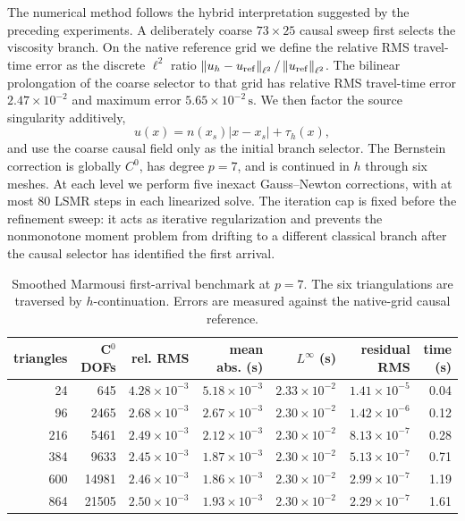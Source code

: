 \documentclass[preprint,12pt]{elsarticle}
\newcommand{\norm}[1]{\left\lVert #1\right\rVert}
\begin{document}
The numerical method follows the hybrid interpretation suggested by the preceding experiments.  A deliberately coarse $73\times25$ causal sweep first selects the viscosity branch.  On the native reference grid we define the relative RMS travel-time error as the discrete $\ell^2$ ratio $\norm{u_h-u_{\rm ref}}_{\ell^2}/\norm{u_{\rm ref}}_{\ell^2}$.  The bilinear prolongation of the coarse selector to that grid has relative RMS travel-time error $2.47\times10^{-2}$ and maximum error $5.65\times10^{-2}\,\mathrm{s}$.  We then factor the source singularity additively,
\[
  u(x)=n(x_s)|x-x_s|+\tau_h(x),
\]
and use the coarse causal field only as the initial branch selector.  The Bernstein correction is globally $C^0$, has degree $p=7$, and is continued in $h$ through six meshes.  At each level we perform five inexact Gauss--Newton corrections, with at most 80 LSMR steps in each linearized solve.  The iteration cap is fixed before the refinement sweep: it acts as iterative regularization and prevents the nonmonotone moment problem from drifting to a different classical branch after the causal selector has identified the first arrival.

\begin{table}[t]
\centering
\small
\caption{Smoothed Marmousi first-arrival benchmark at $p=7$.  The six triangulations are traversed by $h$-continuation.  Errors are measured against the native-grid causal reference.}
\label{tab:marmousi}
\begin{tabular}{rrrrrrr}
\toprule
triangles & C$^0$ DOFs & rel. RMS & mean abs. (s) & $L^\infty$ (s) & residual RMS & time (s)\\
\midrule
24  & 645   & $4.28\times10^{-3}$ & $5.18\times10^{-3}$ & $2.33\times10^{-2}$ & $1.41\times10^{-5}$ & 0.04\\
96  & 2465  & $2.68\times10^{-3}$ & $2.67\times10^{-3}$ & $2.30\times10^{-2}$ & $1.42\times10^{-6}$ & 0.12\\
216 & 5461  & $2.49\times10^{-3}$ & $2.12\times10^{-3}$ & $2.30\times10^{-2}$ & $8.13\times10^{-7}$ & 0.28\\
384 & 9633  & $2.45\times10^{-3}$ & $1.87\times10^{-3}$ & $2.30\times10^{-2}$ & $5.13\times10^{-7}$ & 0.71\\
600 & 14981 & $2.46\times10^{-3}$ & $1.86\times10^{-3}$ & $2.30\times10^{-2}$ & $2.99\times10^{-7}$ & 1.19\\
864 & 21505 & $2.50\times10^{-3}$ & $1.93\times10^{-3}$ & $2.30\times10^{-2}$ & $2.29\times10^{-7}$ & 1.61\\
\bottomrule
\end{tabular}
\end{table}
\end{document}
